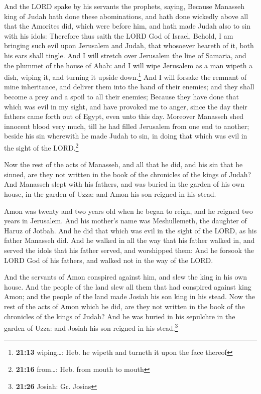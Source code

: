  And the LORD spake by his servants the prophets, saying,
 Because Manasseh king of Judah hath done these
abominations, and hath done wickedly above all that the Amorites did,
which were before him, and hath made Judah also to sin with his idols:
 Therefore thus saith the LORD God of Israel, Behold, I
am bringing such evil upon Jerusalem and Judah, that whosoever heareth
of it, both his ears shall tingle.  And I will stretch
over Jerusalem the line of Samaria, and the plummet of the house of
Ahab: and I will wipe Jerusalem as a man wipeth a dish, wiping it, and
turning it upside down.\footnote{\textbf{21:13} wiping\ldots: Heb. he
  wipeth and turneth it upon the face thereof}  And I
will forsake the remnant of mine inheritance, and deliver them into the
hand of their enemies; and they shall become a prey and a spoil to all
their enemies;  Because they have done that which was
evil in my sight, and have provoked me to anger, since the day their
fathers came forth out of Egypt, even unto this day. 
Moreover Manasseh shed innocent blood very much, till he had filled
Jerusalem from one end to another; beside his sin wherewith he made
Judah to sin, in doing that which was evil in the sight of the
LORD.\footnote{\textbf{21:16} from\ldots: Heb. from mouth to mouth}

 Now the rest of the acts of Manasseh, and all that he
did, and his sin that he sinned, are they not written in the book of the
chronicles of the kings of Judah?  And Manasseh slept
with his fathers, and was buried in the garden of his own house, in the
garden of Uzza: and Amon his son reigned in his stead.

 Amon was twenty and two years old when he began to
reign, and he reigned two years in Jerusalem. And his mother's name was
Meshullemeth, the daughter of Haruz of Jotbah.  And he
did that which was evil in the sight of the LORD, as his father Manasseh
did.  And he walked in all the way that his father walked
in, and served the idols that his father served, and worshipped them:
 And he forsook the LORD God of his fathers, and walked
not in the way of the LORD.

 And the servants of Amon conspired against him, and slew
the king in his own house.  And the people of the land
slew all them that had conspired against king Amon; and the people of
the land made Josiah his son king in his stead.  Now the
rest of the acts of Amon which he did, are they not written in the book
of the chronicles of the kings of Judah?  And he was
buried in his sepulchre in the garden of Uzza: and Josiah his son
reigned in his stead.\footnote{\textbf{21:26} Josiah: Gr. Josias}

